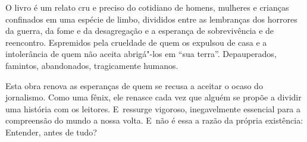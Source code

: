 O livro é um relato cru e preciso do cotidiano de homens, mulheres e
crianças confinados em uma espécie de limbo, divididos entre as
lembranças dos horrores da guerra, da fome e da desagregação e a
esperança de sobrevivência e de reencontro. Espremidos pela crueldade de
quem os expulsou de casa e a intolerância de quem não aceita abrigá"-los
em ``sua terra''. Depauperados, famintos, abandonados, tragicamente
humanos.

Esta obra renova as esperanças de quem se recusa a aceitar o ocaso do
jornalismo. Como uma fênix, ele renasce cada vez que alguém se propõe a
dividir uma história com os leitores. E~ressurge vigoroso, inegavelmente
essencial para a compreensão do mundo a nossa volta. E~não é essa a
razão da própria existência: Entender, antes de tudo?
